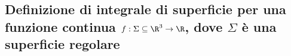 \subsection{Definizione di integrale di superficie per una funzione continua
$f:\Sigma\subseteq\R^3\to\R$, dove $\Sigma$ è una superficie regolare}
